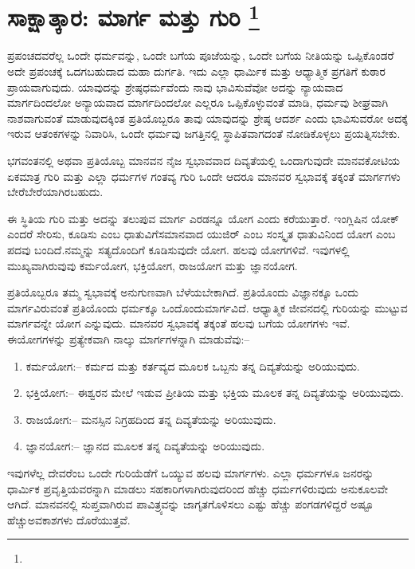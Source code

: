 
\chapter[ಸಾಕ್ಷಾತ್ಕಾರ: ಮಾರ್ಗ ಮತ್ತು ಗುರಿ ]{ಸಾಕ್ಷಾತ್ಕಾರ: ಮಾರ್ಗ ಮತ್ತು ಗುರಿ \protect\footnote{}}

ಪ್ರಪಂಚದವರೆಲ್ಲ ಒಂದೇ ಧರ್ಮವನ್ನು, ಒಂದೇ ಬಗೆಯ ಪೂಜೆಯನ್ನು, ಒಂದೇ ಬಗೆಯ ನೀತಿಯನ್ನು ಒಪ್ಪಿಕೊಂಡರೆ ಅದೇ ಪ್ರಪಂಚಕ್ಕೆ ಒದಗಬಹುದಾದ ಮಹಾ ದುರ್ಗತಿ. ಇದು ಎಲ್ಲಾ ಧಾರ್ಮಿಕ ಮತ್ತು ಆಧ್ಯಾತ್ಮಿಕ ಪ್ರಗತಿಗೆ ಕುಠಾರ ಪ್ರಾಯವಾಗುವುದು. ಯಾವುದನ್ನು ಶ್ರೇಷ್ಠಧರ್ಮವೆಂದು ನಾವು ಭಾವಿಸುವೆವೋ ಅದನ್ನು ನ್ಯಾಯವಾದ ಮಾರ್ಗದಿಂದಲೋ ಅನ್ಯಾಯವಾದ ಮಾರ್ಗದಿಂದಲೋ ಎಲ್ಲರೂ ಒಪ್ಪಿಕೊಳ್ಳುವಂತೆ ಮಾಡಿ, ಧರ್ಮವು ಶೀಘ್ರವಾಗಿ ನಾಶವಾಗುವಂತೆ ಮಾಡುವುದಕ್ಕಿಂತ ಪ್ರತಿಯೊಬ್ಬರೂ ತಾವು ಯಾವುದನ್ನು ಶ್ರೇಷ್ಠ ಆದರ್ಶ ಎಂದು ಭಾವಿಸುವರೋ ಅದಕ್ಕೆ ಇರುವ ಆತಂಕಗಳನ್ನು ನಿವಾರಿಸಿ, ಒಂದೇ ಧರ್ಮವು ಜಗತ್ತಿನಲ್ಲಿ ಸ್ಥಾಪಿತವಾಗದಂತೆ ನೋಡಿಕೊಳ್ಳಲು ಪ್ರಯತ್ನಿಸಬೇಕು.

ಭಗವಂತನಲ್ಲಿ ಅಥವಾ ಪ್ರತಿಯೊಬ್ಬ ಮಾನವನ ನೈಜ ಸ್ವಭಾವವಾದ ದಿವ್ಯತೆಯಲ್ಲಿ ಒಂದಾಗುವುದೇ ಮಾನವಕೋಟಿಯ ಏಕಮಾತ್ರ ಗುರಿ ಮತ್ತು ಎಲ್ಲಾ ಧರ್ಮಗಳ ಗಂತವ್ಯ ಗುರಿ ಒಂದೇ ಆದರೂ ಮಾನವರ ಸ್ವಭಾವಕ್ಕೆ ತಕ್ಕಂತೆ ಮಾರ್ಗಗಳು ಬೇರೆಬೇರೆಯಾಗಿರ\-ಬಹುದು.

ಈ ಸ್ಥಿತಿಯ ಗುರಿ ಮತ್ತು ಅದನ್ನು ತಲುಪುವ ಮಾರ್ಗ ಎರಡನ್ನೂ ಯೋಗ ಎಂದು ಕರೆಯುತ್ತಾರೆ. ಇಂಗ್ಲಿಷಿನ ಯೋಕ್​ ಎಂದರೆ ಸೇರಿಸು, ಕೂಡಿಸು ಎಂಬ ಧಾತುವಿಗೆ\break ಸಮಾನವಾದ ಯುಜಿರ್​ ಎಂಬ ಸಂಸ್ಕೃತ ಧಾತುವಿನಿಂದ ಯೋಗ ಎಂಬ ಪದವು ಬಂದಿದೆ.\break ನಮ್ಮನ್ನು ಸತ್ಯದೊಂದಿಗೆ ಕೂಡಿಸುವುದೇ ಯೋಗ. ಹಲವು ಯೋಗಗಳಿವೆ. ಇವುಗಳಲ್ಲಿ ಮುಖ್ಯವಾಗಿರುವುವು ಕರ್ಮಯೋಗ, ಭಕ್ತಿಯೋಗ, ರಾಜಯೋಗ ಮತ್ತು ಜ್ಞಾನಯೋಗ.

ಪ್ರತಿಯೊಬ್ಬರೂ ತಮ್ಮ ಸ್ವಭಾವಕ್ಕೆ ಅನುಗುಣವಾಗಿ ಬೆಳೆಯಬೇಕಾಗಿದೆ. ಪ್ರತಿಯೊಂದು ವಿಜ್ಞಾನಕ್ಕೂ ಒಂದು ಮಾರ್ಗವಿರುವಂತೆ ಪ್ರತಿಯೊಂದು ಧರ್ಮಕ್ಕೂ ಒಂದೊಂದು\break ಮಾರ್ಗವಿದೆ. ಆಧ್ಯಾತ್ಮಿಕ ಜೀವನದಲ್ಲಿ ಗುರಿಯನ್ನು ಮುಟ್ಟುವ ಮಾರ್ಗವನ್ನೇ ಯೋಗ ಎನ್ನುವುದು. ಮಾನವರ ಸ್ವಭಾವಕ್ಕೆ ತಕ್ಕಂತೆ ಹಲವು ಬಗೆಯ ಯೋಗಗಳು ಇವೆ. ಈ\break ಯೋಗಗಳನ್ನು ಪ್ರತ್ಯೇಕವಾಗಿ ನಾಲ್ಕು ಮಾರ್ಗಗಳನ್ನಾಗಿ ಮಾಡುವೆವು:–

\begin{enumerate}
\item ಕರ್ಮಯೋಗ:– ಕರ್ಮದ ಮತ್ತು ಕರ್ತವ್ಯದ ಮೂಲಕ ಒಬ್ಬನು ತನ್ನ ದಿವ್ಯತೆಯನ್ನು ಅರಿಯುವುದು.

 \item ಭಕ್ತಿಯೋಗ:– ಈಶ್ವರನ ಮೇಲೆ ಇಡುವ ಪ್ರೀತಿಯ ಮತ್ತು ಭಕ್ತಿಯ ಮೂಲಕ ತನ್ನ ದಿವ್ಯತೆಯನ್ನು ಅರಿಯುವುದು.

 \item ರಾಜಯೋಗ:– ಮನಸ್ಸಿನ ನಿಗ್ರಹದಿಂದ ತನ್ನ ದಿವ್ಯತೆಯನ್ನು ಅರಿಯುವುದು.

 \item ಜ್ಞಾನಯೋಗ:– ಜ್ಞಾನದ ಮೂಲಕ ತನ್ನ ದಿವ್ಯತೆಯನ್ನು ಅರಿಯುವುದು.

\end{enumerate}

ಇವುಗಳೆಲ್ಲ ದೇವರೆಂಬ ಒಂದೇ ಗುರಿಯೆಡೆಗೆ ಒಯ್ಯುವ ಹಲವು ಮಾರ್ಗಗಳು. ಎಲ್ಲಾ ಧರ್ಮಗಳೂ ಜನರನ್ನು ಧಾರ್ಮಿಕ ಪ್ರವೃತ್ತಿಯವರನ್ನಾಗಿ ಮಾಡಲು ಸಹಕಾರಿಗಳಾಗಿರುವುದರಿಂದ ಹೆಚ್ಚು ಧರ್ಮಗಳಿರುವುದು ಅನುಕೂಲವೇ ಆಗಿದೆ. ಮಾನವನಲ್ಲಿ ಸುಪ್ತವಾಗಿರುವ ಪಾವಿತ್ರ್ಯವನ್ನು ಜಾಗೃತಗೊಳಿಸಲು ಎಷ್ಟು ಹೆಚ್ಚು ಪಂಗಡಗಳಿದ್ದರೆ ಅಷ್ಟೂ ಹೆಚ್ಚು\break ಅವಕಾಶಗಳು ದೊರೆಯುತ್ತವೆ.

